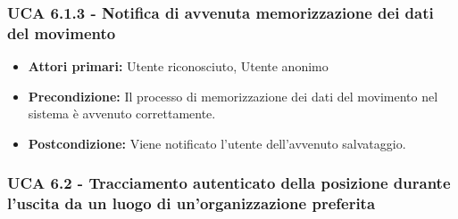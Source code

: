 \subsubsection{UCA 6.1.3 - Notifica di avvenuta memorizzazione dei dati del movimento}
\begin{itemize}
	\item \textbf{Attori primari:} Utente riconosciuto, Utente anonimo
	\item \textbf{Precondizione:} Il processo di memorizzazione dei dati del movimento nel sistema è avvenuto correttamente.
	\item \textbf{Postcondizione:} Viene notificato l'utente dell'avvenuto salvataggio.
\end{itemize}

\subsubsection{UCA 6.2 - Tracciamento autenticato della posizione durante l'uscita da un luogo di un'organizzazione preferita}
